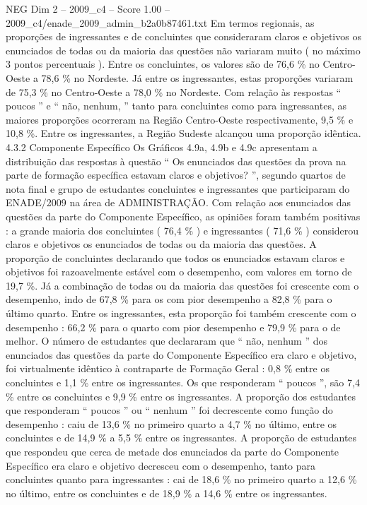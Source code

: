 \begin{textsample}{NEG Dim 2 – 2009\_c4 – Score 1.00 – 2009\_c4/enade\_2009\_admin\_b2a0b87461.txt}
Em termos regionais, as proporções de ingressantes e de concluintes que consideraram claros e objetivos os enunciados de todas ou da maioria das questões não variaram muito ( no máximo 3 pontos percentuais ).
Entre os concluintes, os valores são de 76,6 \% no Centro-Oeste a 78,6 \% no Nordeste.
Já entre os ingressantes, estas proporções variaram de 75,3 \% no Centro-Oeste a 78,0 \% no Nordeste.
Com relação às respostas “ poucos ” e “ não, nenhum, ” tanto para concluintes como para ingressantes, as maiores proporções ocorreram na Região Centro-Oeste respectivamente, 9,5 \% e 10,8 \%.
Entre os ingressantes, a Região Sudeste alcançou uma proporção idêntica. 4.3.2 Componente Específico Os Gráficos 4.9a, 4.9b e 4.9c apresentam a distribuição das respostas à questão “ Os enunciados das questões da prova na parte de formação específica estavam claros e objetivos? ”, segundo quartos de nota final e grupo de estudantes concluintes e ingressantes que participaram do ENADE/2009 na área de ADMINISTRAÇÃO.
Com relação aos enunciados das questões da parte do Componente Específico, as opiniões foram também positivas : a grande maioria dos concluintes ( 76,4 \% ) e ingressantes ( 71,6 \% ) considerou claros e objetivos os enunciados de todas ou da maioria das questões.
A proporção de concluintes declarando que todos os enunciados estavam claros e objetivos foi razoavelmente estável com o desempenho, com valores em torno de 19,7 \%.
Já a combinação de todas ou da maioria das questões foi crescente com o desempenho, indo de 67,8 \% para os com pior desempenho a 82,8 \% para o último quarto.
Entre os ingressantes, esta proporção foi também crescente com o desempenho : 66,2 \% para o quarto com pior desempenho e 79,9 \% para o de melhor.
O número de estudantes que declararam que “ não, nenhum ” dos enunciados das questões da parte do Componente Específico era claro e objetivo, foi virtualmente idêntico à contraparte de Formação Geral : 0,8 \% entre os concluintes e 1,1 \% entre os ingressantes.
Os que responderam “ poucos ”, são 7,4 \% entre os concluintes e 9,9 \% entre os ingressantes.
A proporção dos estudantes que responderam “ poucos ” ou “ nenhum ” foi decrescente como função do desempenho : caiu de 13,6 \% no primeiro quarto a 4,7 \% no último, entre os concluintes e de 14,9 \% a 5,5 \% entre os ingressantes.
A proporção de estudantes que respondeu que cerca de metade dos enunciados da parte do Componente Específico era claro e objetivo decresceu com o desempenho, tanto para concluintes quanto para ingressantes : cai de 18,6 \% no primeiro quarto a 12,6 \% no último, entre os concluintes e de 18,9 \% a 14,6 \% entre os ingressantes.

\end{textsample}
